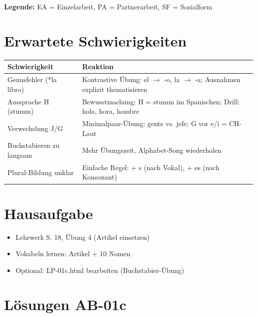 \documentclass[11pt,a4paper]{article}
\begin{document}
\textbf{Legende:} EA = Einzelarbeit, PA = Partnerarbeit, SF = Sozialform

\section{Erwartete Schwierigkeiten}

\begin{tabular}{|p{5cm}|p{8cm}|}
\hline
\textbf{Schwierigkeit} & \textbf{Reaktion} \\
\hline
Genusfehler (*la libro) & Kontrastive Übung: el $\rightarrow$ -o, la $\rightarrow$ -a; Ausnahmen explizit thematisieren \\
\hline
Aussprache H (stumm) & Bewusstmachung: H = stumm im Spanischen; Drill: hola, hora, hombre \\
\hline
Verwechslung J/G & Minimalpaar-Übung: gente vs. jefe; G vor e/i = CH-Laut \\
\hline
Buchstabieren zu langsam & Mehr Übungszeit, Alphabet-Song wiederholen \\
\hline
Plural-Bildung unklar & Einfache Regel: + s (nach Vokal), + es (nach Konsonant) \\
\hline
\end{tabular}

\section{Hausaufgabe}

\begin{itemize}
    \item Lehrwerk S. 18, Übung 4 (Artikel einsetzen)
    \item Vokabeln lernen: Artikel + 10 Nomen
    \item Optional: LP-01c.html bearbeiten (Buchstabier-Übung)
\end{itemize}

\section{Lösungen AB-01c}
\end{document}
